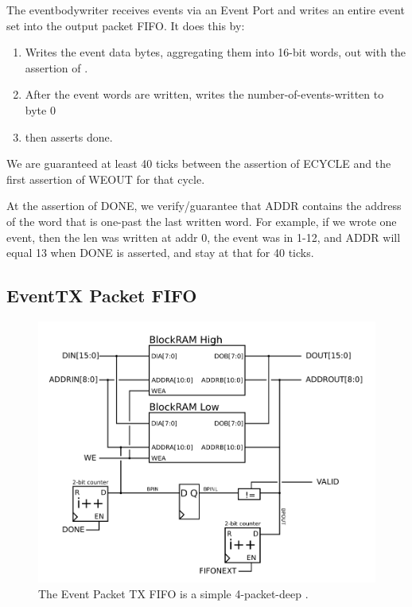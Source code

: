 The eventbodywriter receives events via an Event Port and writes an entire event set into the output packet FIFO. It does this by: 

\begin{enumerate}
\item Writes the event data bytes, aggregating them into 16-bit words, out  with the assertion of . 
\item After the event words are written, writes the number-of-events-written to byte 0
\item then asserts done. 
\end{enumerate}

We are guaranteed at least 40 ticks between the assertion of ECYCLE
and the first assertion of WEOUT for that cycle. 

At the assertion of DONE, we verify/guarantee that ADDR contains the
address of the word that is one-past the last written word. For
example, if we wrote one event, then the len was written at addr 0,
the event was in 1-12, and ADDR will equal 13 when DONE is asserted,
and stay at that for 40 ticks.


\subsection{EventTX Packet FIFO}
\begin{figure}
\begin{centering}
\includegraphics[scale=0.8]{eventtx.packetfifo.svg}
\end{centering}
\caption{The Event Packet TX FIFO is a simple 4-packet-deep .} 
\label{eventpktfifo}
\end{figure}

